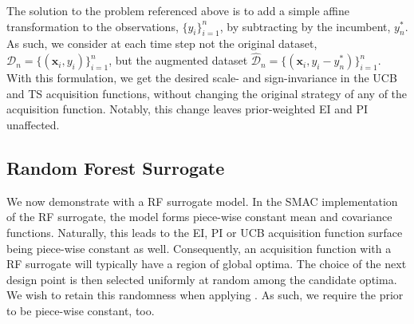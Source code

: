 The solution to the problem referenced above is to add a simple affine transformation to the observations, $\{y_i\}_{i=1}^n$, by subtracting by the incumbent, $y^*_n$. As such, we consider at each time step not the original dataset, $\mathcal{D}_n = \{{(\bm{x}_i, y_i)}\}_{i=1}^n$, but the augmented dataset $\hat{\mathcal{D}}_n = \{{(\bm{x}_i, y_i-y^*_n)}\}_{i=1}^n$. With this formulation, we get the desired scale- and sign-invariance in the UCB and TS acquisition functions, without changing the original strategy of any of the acquisition function. Notably, this change leaves prior-weighted EI and PI unaffected.

\subsection{Random Forest Surrogate}\label{ref:rf_surr}
We now demonstrate \method{} with a RF surrogate model. In the SMAC implementation of the RF surrogate, the model forms piece-wise constant mean and covariance functions. 
Naturally, this leads to the EI, PI or UCB acquisition function surface being piece-wise constant as well. Consequently, an acquisition function with a RF surrogate will typically have a region of global optima. The choice of the next design point is then selected uniformly at random among the candidate optima. We wish to retain this randomness when applying \method. As such, we require the prior to be piece-wise constant, too. 
